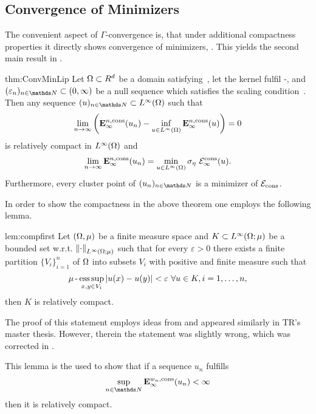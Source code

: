 \subsection{Convergence of Minimizers}
%
The convenient aspect of $\Gamma$-convergence is, that under additional compactness properties it directly shows convergence of minimizers, \cite[Thm. 8]{Brad02}. This yields the second main result in \cite{roith2022continuum}.
%
%
\begin{theorem}{\cite[Thm. 2]{roith2022continuum}}{thm:ConvMinLip}
Let $\Omega\subset R^d$ be a domain satisfying~, 
let the kernel fulfil -, 
and $(\gscale_n)_{n\in\N}\subset(0,\infty)$ be a null sequence which satisfies the scaling 
condition~.
Then any sequence $(u)_{n\in\N}\subset L^{\infty}(\Omega)$ such that 
\begin{align*}
\lim_{n\rightarrow\infty}\left(\mathbf{E}^{n,\mathrm{cons}}_\infty(u_n) - 
\inf_{u\in L^{\infty}(\Omega)}\mathbf{E}^{n,\mathrm{cons}}_\infty(u)\right) = 0
\end{align*}
is relatively compact in $L^{\infty}(\Omega)$ and 
\begin{align*}
\lim_{n\rightarrow\infty} \mathbf{E}^{n,\mathrm{cons}}_\infty(u_n) = 
\min_{u\in L^{\infty}(\Omega)}\sigma_{\eta}~\mathcal{E}^{\mathrm{cons}}_\infty(u).
\end{align*}
Furthermore, every cluster point of $(u_n)_{n\in\N}$ is a minimizer of 
$\mathcal{E}_{\mathrm{cons}}$. 
\end{theorem}
%
%
\noindent%
In order to show the compactness in the above theorem one employs the following lemma.
%
%
\begin{lemma}{\cite[Lem. 4]{roith2022continuum}}{lem:compfirst}
Let $(\Omega,\mu)$ be a finite measure space and $K\subset L^{\infty}(\Omega;\mu)$ be a bounded set w.r.t. $\left\|\cdot\right\|_{L^{\infty}(\Omega;\mu)}$ such that 
for every $\varepsilon>0$ there exists a finite partition $\{V_i\}_{i=1}^n$ of $\Omega$ into subsets $V_i$ with positive and finite measure such that
\begin{align}\label{eq:partinf}
\mu\operatorname{-}\operatorname*{ess\,sup}_{x,y\in V_i} \left|u(x) - u(y)\right| < \varepsilon\ \forall u\in K, i=1,\ldots,n,
\end{align}
then $K$ is relatively compact. 
\end{lemma}
%
\begin{remark}{}{}
The proof of this statement employs ideas from \cite[Lem. IV.5.4]{dunford1988linear} and appeared similarly in TR's master thesis. However, therein the statement was slightly wrong, which was corrected in \cite{roith2022continuum}.
\end{remark}
%
\noindent%
This lemma is the used to show that if a sequence $u_n$ fulfills
\begin{align*}
\sup_{n\in\N}\GE^{w_n,\text{cons}}_\infty(u_n)<\infty
\end{align*}
%
then it is relatively compact.
%
